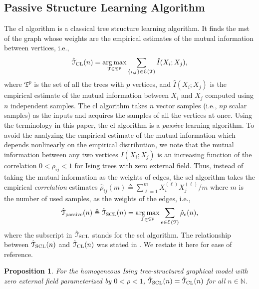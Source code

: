 \documentclass[11pt,onecolumn]{article}
\newcommand{\calE}{\mathcal{E}}
\newcommand{\calT}{\mathcal{T}}
\newcommand{\hatcalT}{\hat{\calT}}
\newcommand{\bbN}{\mathbb{N}}
\newcommand{\frakT}{\mathfrak{T}}
\newcommand{\hatI}{\hat{I}}
\newcommand{\hrho}{\hat{\rho}}
\DeclareMathOperator*{\argmax}{arg\,max}
\newtheorem{proposition}{Proposition}
\newcommand{\Passive}{{\rm passive}}
\begin{document}
\subsection{Passive Structure Learning Algorithm}\label{sec:pasivlearn}
The \ac{cl} algorithm is a classical tree structure learning algorithm\cite{chow1968approximating}. It finds the \ac{mst} of the graph whose weights are the empirical estimates of the mutual information between vertices, i.e.,
\begin{align}
	\hatcalT_{\rm{CL}}(n)=\argmax_{\calT\in\frakT^{p}} \sum_{\{i,j\}\in\calE(\calT)} \hatI(X_{i};X_{j}),
\end{align}
where $\frakT^{p}$ is the set of all the trees with $p$ vertices, and $\hatI(X_{i};X_{j})$ is the empirical estimate of the mutual information between $X_{i}$ and $X_{j}$ computed using $n$ independent samples. The \ac{cl} algorithm takes $n$ vector samples (i.e., $np$ 
scalar samples) as the inputs and acquires the samples of all the vertices at once. Using the terminology in this paper, the \ac{cl} algorithm is a   \emph{passive} learning algorithm. To avoid the analyzing the empirical estimate 
of the mutual information which depends nonlinearly on the empirical distribution, we note that the mutual information between any two vertices $I(X_{i};X_{j})$ is an increasing function of the correlation $0<\rho_{ij}<1$ for Ising trees with zero external field. Thus, instead of taking the mutual 
information as the weights of edges, the \ac{scl} algorithm takes the empirical {\em correlation} estimates  $\hrho_{ij}(m) \triangleq \sum_{\ell=1}^{m}X_{i}^{(\ell)}X_{j}^{(\ell)}/ m$ where $m$ is the number of used samples, as the weights of the edges, i.e.,
\begin{align}\label{eq:cl}
	\hatcalT_{\Passive}(n)\triangleq\hatcalT_{\rm{SCL}}(n)=\argmax_{\calT\in\frakT^{p}} \sum_{e\in\calE(\calT)} \hrho_{e}(n),
\end{align}
where the subscript in $\hatcalT_{\rm{SCL}}$ stands for the \ac{scl} algorithm. The relationship between $\hatcalT_{\rm{SCL}}(n)$ and $\hatcalT_{\rm{CL}}(n)$ was  stated in  \cite[Lemma~A.2]{bresler2020learning}. We restate it here  for ease of reference.
\begin{proposition} \label{prop:SCL}
	For the homogeneous Ising tree-structured graphical model with zero external field  parameterized by $0<\rho<1$, $\hatcalT_{\rm{SCL}}(n)=\hatcalT_{\rm{CL}}(n)$ for all $n\in\bbN$. 
\end{proposition}

\end{document}

